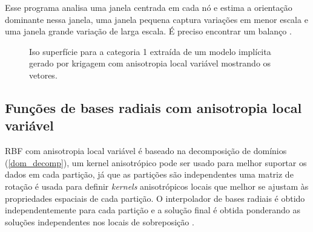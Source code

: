 Esse programa analisa uma janela centrada em cada nó e estima a orientação dominante nessa janela, uma janela pequena captura variações em menor escala e uma janela grande variação de larga escala. É preciso encontrar um balanço \cite{lillah2015inference}.

\begin{figure}[H] 
\caption{Iso superfície para a categoria 1 extraída de um modelo implícita gerado por krigagem com anisotropia local variável mostrando os vetores.} \label{lva_krig}
     \centering
\end{figure}

\subsection{Funções de bases radiais com anisotropia local variável}

RBF com anisotropia local variável é baseado na decomposição de domínios (\autoref{dom_decomp}), um kernel anisotrópico pode ser usado para melhor suportar os dados em cada partição, já que as partições são independentes uma matriz de rotação é usada para definir \textit{kernels} anisotrópicos locais que melhor se ajustam às propriedades espaciais de cada partição. O interpolador de bases radiais é obtido independentemente para cada partição e a solução final é obtida ponderando as soluções independentes nos locais de sobreposição \cite{martin2017implicitmodeling}.

